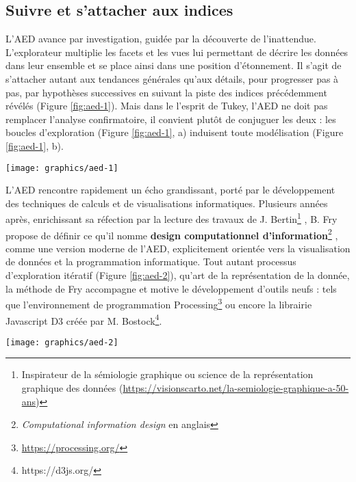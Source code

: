 \documentclass[symmetric,justified,marginals=raggedouter]{tufte-book}
\begin{document}
\subsection{Suivre et s'attacher aux indices}

\noindent L'AED avance par investigation, guidée par la découverte de l'inat\-tendue. L'explorateur multiplie les facets et les vues lui permettant de décrire les données dans leur ensemble et se place ainsi dans une position d'étonnement. Il s'agit de s'attacher autant aux tendances générales qu'aux détails, pour progresser pas à pas, par hypothèses successives en suivant la piste des indices précédemment révélés (Figure \ref{fig:aed-1}). Mais dans le l'esprit de Tukey, l'AED ne doit pas remplacer l'analyse confirmatoire, il convient plutôt de conjuguer les deux : les boucles d'exploration (Figure \ref{fig:aed-1}, a) induisent toute modélisation (Figure \ref{fig:aed-1}, b). 

\newpage

\begin{figure*}%
  \texttt{[image: graphics/aed-1]}
  \caption{L'analyse exploratoire et les diverses phases de l'exploration préfigurent toute analyse confirmatoire}
  \label{fig:aed-1}
\end{figure*} 

\noindent L'AED rencontre rapidement un écho grandissant, porté par le dé\-veloppement des techniques de calculs et de visualisations informatiques. Plusieurs années après, enrichissant sa réfection par la lecture des travaux de J. Bertin\footnote{Inspirateur de la sémiologie graphique ou science de la représentation graphique des données (\url{https://visionscarto.net/la-semiologie-graphique-a-50-ans})} \citep{bertin_semiologie_1973}, B. Fry propose de définir ce qu'il nomme \textbf{design computationnel d'information}\footnote{\textit{Computational information design} en anglais} \citep{fry_computational_2004}, comme une version moderne de l'AED, explicitement orientée vers la visualisation de données et la programmation informatique. Tout autant processus d'exploration itératif (Figure \ref{fig:aed-2}), qu'art de la représentation de la donnée, la méthode de Fry accompagne et motive le dé\-veloppement d'outils neufs : tels que l'environnement de programmation Processing\footnote{\url{https://processing.org/}} ou encore la librairie Javascript D3 créée par M. Bostock\footnote{https://d3js.org/}.

\begin{figure*}%
  \texttt{[image: graphics/aed-2]}
  \caption{Étapes du design computationnel d'information et ensemble des boucles d'analyses possibles selon \citep{fry_computational_2004}}
  \label{fig:aed-2}
\end{figure*} 
\end{document}
